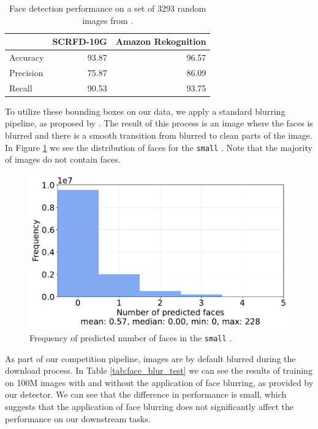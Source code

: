 \begin{table}
\renewcommand{\arraystretch}{1.1}
    \centering
    \caption{Face detection performance on a set of 3293 random images from \pool.}
    \label{tab:face_detection}
    \begin{tabular}{lrr}
    \toprule
    ~ & SCRFD-10G & Amazon Rekognition \\ \midrule
    Accuracy & 93.87 & 96.57 \\
    Precision & 75.87 & 86.09 \\
    Recall & 90.53 & 93.75 \\ \bottomrule
    \end{tabular}
\end{table}

To utilize these bounding boxes on our data, we apply a standard blurring pipeline, as proposed by \citet{yang2022study}. The result of this process is an image where the faces is blurred and there is a smooth transition from blurred to clean parts of the image.
In Figure \ref{fig:faces} we see the distribution of faces for the {\small \texttt{small}} \pool. Note that the majority of images do not contain faces.

\begin{figure}
    \centering
    \includegraphics[width=0.6\linewidth]{figures/appx-faces.pdf}
    \caption{Frequency of predicted number of faces in the {\small \texttt{small}} \pool.}
    \label{fig:faces}
\end{figure}

As part of our competition pipeline, images are by default blurred during the download process. In Table \ref{tab:face_blur_test} we can see the results of training on 100M images with and without the application of face blurring, as provided by our detector. We can see that the difference in performance is small, which suggests that the application of face blurring does not significantly affect the performance on our downstream tasks.

